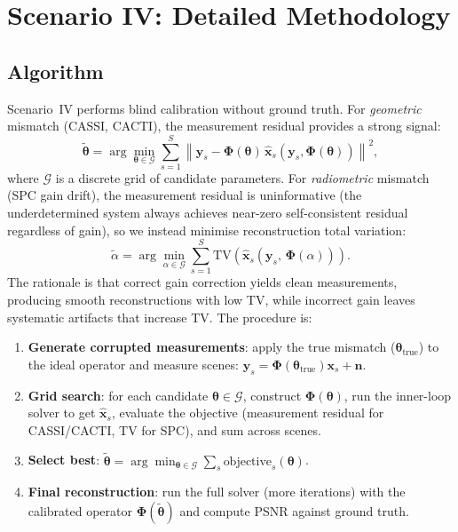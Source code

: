 \documentclass[runningheads]{llncs}
\begin{document}
\section{Scenario IV: Detailed Methodology}
\label{sec:scenario_iv_perscene}

\subsection{Algorithm}

Scenario~IV performs blind calibration without ground truth.
For \emph{geometric} mismatch (CASSI, CACTI), the measurement residual provides a strong signal:
\begin{equation}
    \tilde{\boldsymbol{\theta}} = \arg\min_{\boldsymbol{\theta} \in \mathcal{G}} \sum_{s=1}^{S} \left\| \mathbf{y}_s - \mathbf{\Phi}(\boldsymbol{\theta})\, \hat{\mathbf{x}}_s\!\left(\mathbf{y}_s, \mathbf{\Phi}(\boldsymbol{\theta})\right) \right\|^2,
\end{equation}
where $\mathcal{G}$ is a discrete grid of candidate parameters.
For \emph{radiometric} mismatch (SPC gain drift), the measurement residual is uninformative (the underdetermined system always achieves near-zero self-consistent residual regardless of gain), so we instead minimise reconstruction total variation:
\begin{equation}
    \tilde{\alpha} = \arg\min_{\alpha \in \mathcal{G}} \sum_{s=1}^{S} \mathrm{TV}\!\left(\hat{\mathbf{x}}_s\!\left(\mathbf{y}_s,\, \mathbf{\Phi}(\alpha)\right)\right).
\end{equation}
The rationale is that correct gain correction yields clean measurements, producing smooth reconstructions with low TV, while incorrect gain leaves systematic artifacts that increase TV.
The procedure is:

\begin{enumerate}
    \item \textbf{Generate corrupted measurements}: apply the true mismatch ($\boldsymbol{\theta}_{\text{true}}$) to the ideal operator and measure scenes: $\mathbf{y}_s = \mathbf{\Phi}(\boldsymbol{\theta}_{\text{true}})\mathbf{x}_s + \mathbf{n}$.
    \item \textbf{Grid search}: for each candidate $\boldsymbol{\theta} \in \mathcal{G}$, construct $\mathbf{\Phi}(\boldsymbol{\theta})$, run the inner-loop solver to get $\hat{\mathbf{x}}_s$, evaluate the objective (measurement residual for CASSI/CACTI, TV for SPC), and sum across scenes.
    \item \textbf{Select best}: $\tilde{\boldsymbol{\theta}} = \arg\min_{\boldsymbol{\theta} \in \mathcal{G}} \sum_s \text{objective}_s(\boldsymbol{\theta})$.
    \item \textbf{Final reconstruction}: run the full solver (more iterations) with the calibrated operator $\mathbf{\Phi}(\tilde{\boldsymbol{\theta}})$ and compute PSNR against ground truth.
\end{enumerate}
\end{document}
